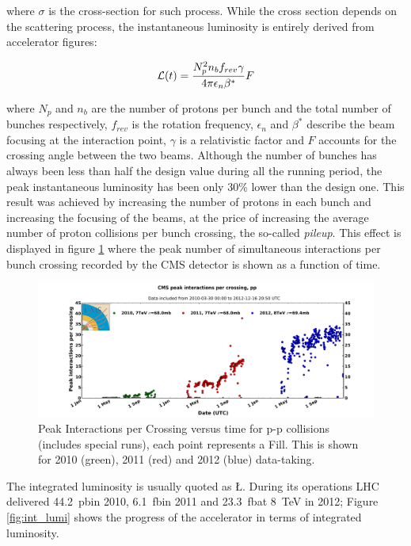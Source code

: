 where $\sigma$ is the cross-section for such process. While the cross section depends on the scattering process, the instantaneous luminosity is entirely derived from accelerator figures:

\begin{equation} 
	\operatorname{{\cal L}}(t) = \frac{N_p^2 n_b f_{rev} \gamma }{4 \pi \epsilon_{n} \beta^*} F
	\label{eq:lumi}
\end{equation} 

where $N_p$ and $n_b$ are the number of protons per bunch and the total number of bunches respectively, $f_{rev}$ is the rotation frequency, $\epsilon_{n}$ and $\beta^*$ describe the beam focusing at the interaction point, $\gamma$ is a relativistic factor and $F$ accounts for the crossing angle between the two beams. Although the number of bunches has always been less than half the design value during all the running period, the peak instantaneous luminosity has been only 30\% lower than the design one. This result was achieved by increasing the number of protons in each bunch and increasing the focusing of the beams, at the price of increasing the average number of proton collisions per bunch crossing, the so-called \emph{pileup}. This effect is displayed in figure \ref{fig:lhc_pileup} where the peak number of simultaneous interactions per bunch crossing recorded by the CMS detector is shown as a function of time.

\begin{figure}
\begin{center}
\includegraphics[angle=-0,width=\textwidth]{2_LHC_and_CMS/pics/peak_pu_pp.pdf}
\caption{Peak Interactions per Crossing versus time for p-p collisions (includes special runs), each point represents a Fill. This is shown for 2010 (green), 2011 (red) and 2012 (blue) data-taking.
\label{fig:lhc_pileup}
}
\end{center}
\end{figure}

The integrated luminosity is usually quoted as \L. During its operations LHC delivered 44.2~pb\Inv in 2010, 6.1~fb\Inv in 2011 and 23.3~fb\Inv at 8~TeV in 2012; Figure \ref{fig:int_lumi} shows the progress of the accelerator in terms of integrated luminosity.

